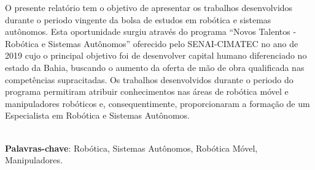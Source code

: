 \begin{thesisresumo}
  
  O presente relatório tem o objetivo de apresentar os trabalhos desenvolvidos durante o periodo vingente da bolsa de estudos em robótica e sistemas autônomos. Esta oportunidade surgiu através do programa ``Novos Talentos - Robótica e Sistemas Autônomos'' oferecido pelo SENAI-CIMATEC no ano de 2019 cujo o principal objetivo foi de desenvolver capital humano diferenciado no estado da Bahia, buscando o aumento da oferta de mão de obra qualificada nas competências supracitadas. Os trabalhos desenvolvidos durante o periodo do programa permitiram atribuir conhecimentos nas áreas de robótica móvel e manipuladores robóticos e, consequentimente, proporcionaram a formação de um Especialista em Robótica e Sistemas Autônomos.

\ \\


\textbf{Palavras-chave}: Robótica, Sistemas Autônomos, Robótica Móvel, Manipuladores.

\end{thesisresumo}
